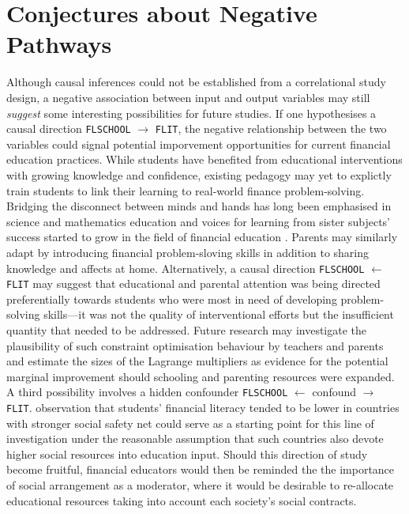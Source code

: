 \documentclass[a4paper,11pt,UKenglish,twoside,openright]{report}\usepackage[]{graphicx}\usepackage[]{color}
\begin{document}
\section{Conjectures about Negative Pathways}

Although causal inferences could not be established from a correlational study design, a negative association between input and output variables may still \emph{suggest} some interesting possibilities for future studies. If one hypothesises a causal direction \texttt{FLSCHOOL} $\longrightarrow$ \texttt{FLIT}, the negative relationship between the two variables could signal potential imporvement opportunities for current financial education practices. While students have benefited from educational interventions with growing knowledge and confidence, existing pedagogy may yet to explictly train students to link their learning to real-world finance problem-solving. Bridging the disconnect between minds and hands has long been emphasised in science \parencite{harlen:1999} and mathematics \parencite{smith:1996} education and voices for learning from sister subjects' success started to grow in the field of financial education \parencite{marleypayne:2021}. Parents may similarly adapt by introducing financial problem-sloving skills in addition to sharing knowledge and affects at home. Alternatively, a causal direction \texttt{FLSCHOOL} $\longleftarrow$ \texttt{FLIT} may suggest that educational and parental attention was being directed preferentially towards students who were most in need of developing problem-solving skills---it was not the quality of interventional efforts but the insufficient quantity that needed to be addressed. Future research may investigate the plausibility of such constraint optimisation behaviour by teachers and parents and estimate the sizes of the Lagrange multipliers as evidence for the potential marginal improvement should schooling and parenting resources were expanded. A third possibility involves a hidden confounder \texttt{FLSCHOOL} $\longleftarrow$ confound $\longrightarrow$ \texttt{FLIT}.  observation that students' financial literacy tended to be lower in countries with stronger social safety net could serve as a starting point for this line of investigation under the reasonable assumption that such countries also devote higher social resources into education input. Should this direction of study become fruitful, financial educators would then be reminded the the importance of social arrangement as a moderator, where it would be desirable to re-allocate educational resources taking into account each society's social contracts.
\end{document}
